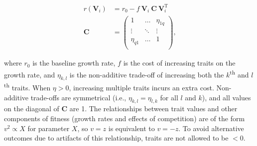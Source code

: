 \begin{equation} \label{eq:growth-rate}
\begin{split}
    r(\mathbf{V}_i) &= r_0 - f ~ \mathbf{V}_i ~ \mathbf{C} ~ \mathbf{V}_{i}^{\textrm{T}} \\
    \mathbf{C} &= \begin{pmatrix}
        1         & \ldots & \eta_{1q} \\
        \vdots    & \ddots & \vdots \\
        \eta_{q1} & \ldots & 1      \\
        \end{pmatrix}
    \textrm{,}
\end{split}
\end{equation}

\noindent where $r_0$ is the baseline growth rate,
$f$ is the cost of increasing traits on the growth rate, and
$\eta_{k,l}$ is the non-additive trade-off of increasing both the
$k$\textsuperscript{th} and $l$\textsuperscript{th} traits.
When $\eta > 0$, increasing multiple traits incurs an extra cost.
Non-additive trade-offs are symmetrical (i.e., $\eta_{k,l} = \eta_{l,k}$ for all
$l$ and $k$), and all values on the diagonal of $\mathbf{C}$ are 1.
The relationships between trait values and other components of fitness
(growth rates and effects of competition) are of the form
$v^2 \propto X$ for parameter $X$, so $v = z$ is equivalent to $v = -z$.
To avoid alternative outcomes due to artifacts of this relationship, traits are not
allowed to be $< 0$.


%
%


